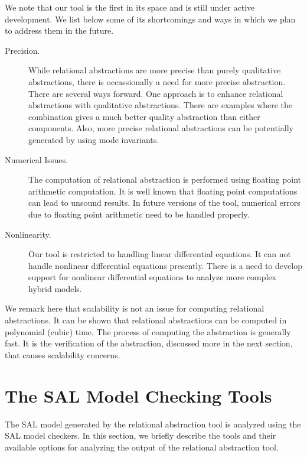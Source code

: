 \documentclass{llncs}
\begin{document}
We note that our tool is the first in its space and is still
under active development.  
We list below some of its shortcomings and ways in which we
plan to address them in the future.
\begin{description}
\item[Precision.]
While relational abstractions are more precise than purely qualitative
abstractions, there is occassionally a need for more precise 
abstraction.  There are several ways forward.  One approach is to
enhance relational abstractions with qualitative abstractions.
There are examples where the combination gives a  much better quality
abstraction than either components.
Also, more precise relational abstractions can be potentially generated
by using mode invariants.
\item[Numerical Issues.]
The computation of relational abstraction is performed using 
floating point arithmetic computation.  It is well known that
floating point computations can lead to unsound results.
In future versions of the tool,
numerical errors due to floating point arithmetic need
to be handled properly.
\item[Nonlinearity.]
Our tool is restricted to handling linear differential equations.  It
can not handle nonlinear differential equations presently.
There is a need to develop support for nonlinear differential equations 
to analyze more complex hybrid models.
\end{description}

We remark here that scalability is not an issue for
computing relational abstractions.  It can be shown that relational
abstractions can be computed in polynomial (cubic) time.
The process of computing the abstraction is generally fast.
It is the verification of the abstraction, discussed more in the next section,
that causes scalability concerns.


\section{The SAL Model Checking Tools}
\label{sec-sal}

The SAL model generated by the relational abstraction tool
is analyzed using the SAL model checkers.
In this section, we briefly describe the tools and their 
available options for analyzing the output of the relational
abstraction tool.
\end{document}
